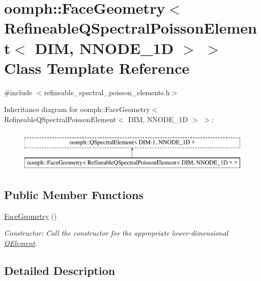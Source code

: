 \hypertarget{classoomph_1_1FaceGeometry_3_01RefineableQSpectralPoissonElement_3_01DIM_00_01NNODE__1D_01_4_01_4}{}\section{oomph\+:\+:Face\+Geometry$<$ Refineable\+Q\+Spectral\+Poisson\+Element$<$ D\+IM, N\+N\+O\+D\+E\+\_\+1D $>$ $>$ Class Template Reference}
\label{classoomph_1_1FaceGeometry_3_01RefineableQSpectralPoissonElement_3_01DIM_00_01NNODE__1D_01_4_01_4}


{\ttfamily \#include $<$refineable\+\_\+spectral\+\_\+poisson\+\_\+elements.\+h$>$}

Inheritance diagram for oomph\+:\+:Face\+Geometry$<$ Refineable\+Q\+Spectral\+Poisson\+Element$<$ D\+IM, N\+N\+O\+D\+E\+\_\+1D $>$ $>$\+:\begin{figure}[H]
\begin{center}
\leavevmode
\includegraphics[height=2.000000cm]{classoomph_1_1FaceGeometry_3_01RefineableQSpectralPoissonElement_3_01DIM_00_01NNODE__1D_01_4_01_4}
\end{center}
\end{figure}
\subsection*{Public Member Functions}
\begin{DoxyCompactItemize}
\item 
\hyperlink{classoomph_1_1FaceGeometry_3_01RefineableQSpectralPoissonElement_3_01DIM_00_01NNODE__1D_01_4_01_4_acdf070b85d2bc39509209149ccbf7abc}{Face\+Geometry} ()
\begin{DoxyCompactList}\small\item\em Constructor\+: Call the constructor for the appropriate lower-\/dimensional \hyperlink{classoomph_1_1QElement}{Q\+Element}. \end{DoxyCompactList}\end{DoxyCompactItemize}


\subsection{Detailed Description}
